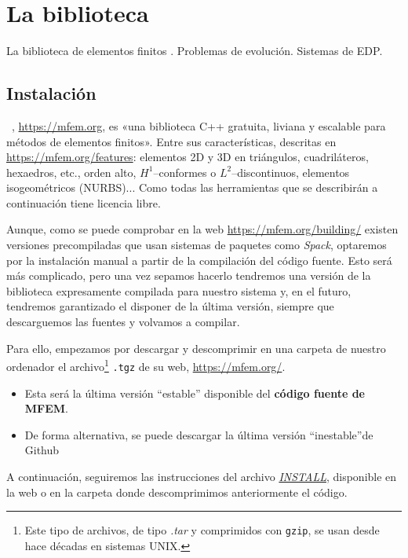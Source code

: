 \section{La biblioteca \mfem}

\begin{contenidos}
La biblioteca de elementos finitos \mfem. Problemas de evolución. Sistemas de EDP.
\end{contenidos}

\subsection{Instalación}
\label{sec:03:instalacion}

\mfem~\cite{ANDERSON202142}, \url{https://mfem.org}, es «una
biblioteca C++ gratuita, liviana y escalable para métodos de elementos
finitos».  Entre sus características, descritas en
\url{https://mfem.org/features}: elementos 2D y 3D en triángulos,
cuadriláteros, hexaedros, etc., orden alto, $H^1$--conformes o
$L^2$--discontinuos, elementos isogeométricos (NURBS)...  Como todas
las herramientas que se describirán a continuación \mfem tiene
licencia libre.

Aunque, como se puede comprobar en la web
\url{https://mfem.org/building/} existen versiones precompiladas que
usan sistemas de paquetes como \textit{Spack}, optaremos por la
instalación manual a partir de la compilación del código fuente.
Esto será más complicado, pero una vez sepamos hacerlo tendremos una
versión de la biblioteca expresamente compilada para nuestro sistema
y, en el futuro, tendremos garantizado el disponer de la última
versión, siempre que descarguemos las fuentes y volvamos a compilar.

Para ello, empezamos por descargar y descomprimir en una carpeta de
nuestro ordenador el archivo\footnote{Este tipo de archivos, de tipo
  \textit{.tar} y comprimidos con \texttt{gzip}, se usan desde hace
  décadas en sistemas UNIX.}  \texttt{.tgz} de su web,
\url{https://mfem.org/}.
\begin{itemize}
\item Esta será la última versión ``estable'' disponible del \textbf{código fuente de MFEM}.
\item De forma alternativa, se puede descargar la última versión ``inestable''de Github
\end{itemize}


A continuación, seguiremos las instrucciones del archivo
\href{https://raw.githubusercontent.com/mfem/mfem/master/INSTALL}{\textit{INSTALL}},
disponible en la web o en la carpeta donde descomprimimos anteriormente el código.

